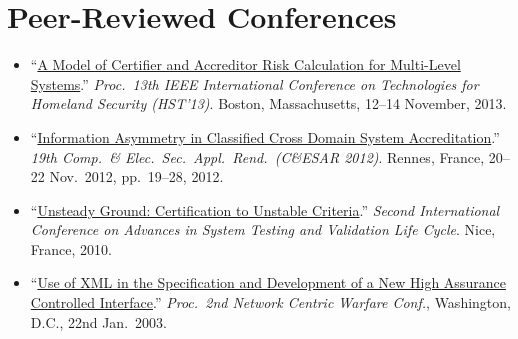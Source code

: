 \documentclass[12pt,twoside,letterpaper]{article}
\begin{document}
\section*{Peer-Reviewed Conferences}
\vspace{-2mm}
\begin{itemize}
	\item ``\href{http://ieeexplore.ieee.org/xpls/abs_all.jsp?arnumber=6699004}%
{A Model of Certifier and Accreditor Risk Calculation for Multi-Level
Systems}.'' \emph{Proc.\ 13th IEEE International Conference on Technologies
for Homeland Security (HST'13)}. Boston, Massachusetts, 12--14 November,
2013.\vspace{-1mm}

	\item
``\href{http://call-with-current-continuation.com/papers/CESAR2012_information_asymmetry.pdf}%
{Information Asymmetry in Classified Cross Domain System Accreditation}.''
\emph{19th Comp.\ \& Elec.\ Sec.\ Appl.\ Rend.\ (C\&ESAR 2012)}. Rennes,
France, 20--22 Nov.\ 2012, pp.\ 19--28, 2012.\vspace{-1mm}

	\item
``\href{http://ieeexplore.ieee.org/xpl/articleDetails.jsp?arnumber=5617171}%
{Unsteady Ground: Certification to Unstable Criteria}.'' \emph{Second
International Conference on Advances in System Testing and Validation Life
Cycle}. Nice, France, 2010.\vspace{-1mm}


	\item ``\href{http://call-with-current-continuation.com/papers/xml_paper.pdf}%
{Use of XML in the Specification and Development of a New High Assurance
Controlled Interface}.'' \emph{Proc.\ 2nd Network Centric Warfare Conf.},
Washington, D.C., 22nd Jan.\ 2003.
\end{itemize}

\vspace{-8mm}
\end{document}
